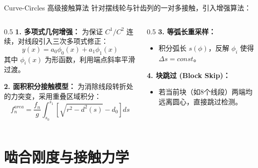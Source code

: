 \documentclass[aspectratio=169,10pt,xcolor=table]{ctexbeamer}
\begin{document}
\begin{frame}{Curve-Circles 高级接触算法}
  针对摆线轮与针齿列的一对多接触，引入增强算法：
  
  \begin{columns}[T]
    \begin{column}{0.5\textwidth}
      \textbf{1. 多项式几何增强：}
      为保证 $C^1/C^2$ 连续，对线段引入三次多项式修正：
      \small
      \begin{equation}
        y(x) = a_0 \phi_0(x) + a_1 \phi_1(x)
      \end{equation}
      其中 $\phi_i(x)$ 为形函数，利用端点斜率平滑过渡。
      
      \vspace{0.5em}
      \textbf{2. 面积积分接触模型：}
      为消除线段转折处的力突变，采用重叠区域积分：
      \small
      \begin{equation}
      f_n^{area} = \frac{f_n}{g} \int_{s_0}^{s_1} \left[ \sqrt{r^2 - d^2(s)} - d_0 \right] ds
      \end{equation}
    \end{column}
    \begin{column}{0.5\textwidth}
      \textbf{3. 等弧长重采样：}
      \begin{itemize}
          \item 积分弧长 $s(\phi)$，反解 $\phi_i$ 使得 $\Delta s = const$。
      \end{itemize}
      
      \vspace{0.5em}
      \textbf{4. 块跳过 (Block Skip)：}
      \begin{itemize}
          \item 若当前块（如8个线段）两端均远离圆心，直接跳过检测。
      \end{itemize}
      
      \centering
    \end{column}
  \end{columns}
\end{frame}

\section{啮合刚度与接触力学}
\end{document}
